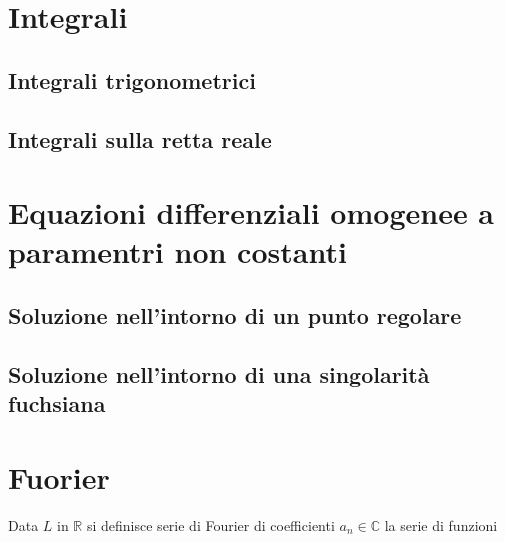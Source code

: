\documentclass[x11names]{article}
\title{}
\author{Matteo Herz}
\date{}
\begin{document}
	

\tableofcontents
\newpage







\section{Integrali}
\subsection{Integrali trigonometrici}
\subsection{Integrali sulla retta reale}

\section{Equazioni differenziali omogenee a paramentri non costanti}
\subsection{Soluzione nell'intorno di un punto regolare}
\subsection{Soluzione nell'intorno di una singolarità fuchsiana}

\section{Fuorier}
Data $L$ in $\mathbb{R}$ si definisce serie di Fourier di coefficienti $a_n \in \mathbb{C}$ la serie di funzioni
\end{document}
